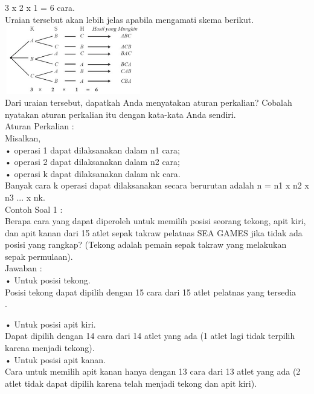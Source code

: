 \documentclass[11pt,fleqn]{book} %
\begin{document}
3 x 2 x 1 = 6 cara.\\

Uraian tersebut akan lebih jelas apabila mengamati skema berikut.\\


\includegraphics[width = 6cm, height= 3cm]{Pictures/gen2.png}\\

Dari uraian tersebut, dapatkah Anda menyatakan aturan perkalian? Cobalah nyatakan aturan perkalian itu dengan kata-kata Anda sendiri.\\

Aturan Perkalian :\\
Misalkan,\\
• operasi 1 dapat dilaksanakan dalam n1 cara;\\
• operasi 2 dapat dilaksanakan dalam n2 cara;\\
• operasi k dapat dilaksanakan dalam nk cara.\\

Banyak cara k operasi dapat dilaksanakan secara berurutan adalah n = n1 x n2 x n3 ... x nk.\\

Contoh Soal 1 :\\

Berapa cara yang dapat diperoleh untuk memilih posisi seorang tekong, apit kiri, dan apit kanan dari 15 atlet sepak takraw pelatnas SEA GAMES jika tidak ada posisi yang rangkap? (Tekong adalah pemain sepak takraw yang melakukan sepak permulaan).\\

Jawaban :\\

• Untuk posisi tekong.\\
Posisi tekong dapat dipilih dengan 15 cara dari 15 atlet pelatnas yang tersedia\\.

• Untuk posisi apit kiri.\\
Dapat dipilih dengan 14 cara dari 14 atlet yang ada (1 atlet lagi tidak terpilih karena menjadi tekong).\\

• Untuk posisi apit kanan.\\
Cara untuk memilih apit kanan hanya dengan 13 cara dari 13 atlet yang ada (2 atlet tidak dapat dipilih karena telah menjadi tekong dan apit kiri).\\
\end{document}

